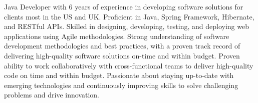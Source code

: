 

\begin{cvparagraph}

Java Developer with 6 years of experience in developing software solutions for clients most in the US and UK. Proficient in Java, Spring Framework, Hibernate, and RESTful APIs. Skilled in designing, developing, testing, and deploying web applications using Agile methodologies. Strong understanding of software development methodologies and best practices, with a proven track record of delivering high-quality software solutions on-time and within budget. Proven ability to work collaboratively with cross-functional teams to deliver high-quality code on time and within budget. Passionate about staying up-to-date with emerging technologies and continuously improving skills to solve challenging problems and drive innovation.
\end{cvparagraph}